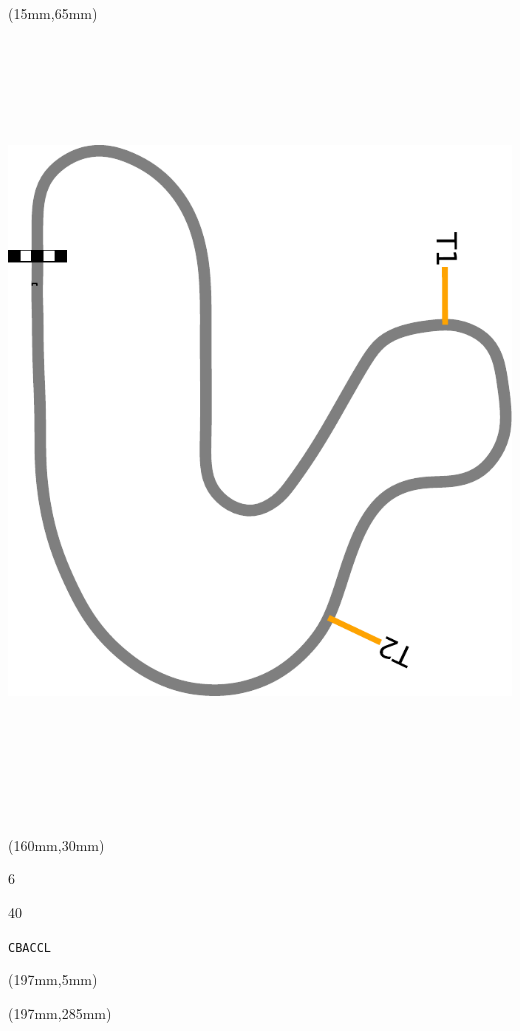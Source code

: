 \begin{textblock*}{185mm}(15mm,65mm)%
\centering
\mbox{\includegraphics[width=185mm,height=210mm,keepaspectratio]{PT/CBACCL.pdf}}
\end{textblock*}
\begin{textblock*}{40mm}(160mm,30mm)%
\Large
\par{} 
\par6 
\par40 
\par\hfill\tiny\tt CBACCL\\
\end{textblock*}
\begin{textblock*}{20mm}(197mm,5mm)%
\fbox{\thepage}
\label{CBACCL}
\end{textblock*}
\begin{textblock*}{20mm}(197mm,285mm)%
\fbox{\thepage}
\end{textblock*}

